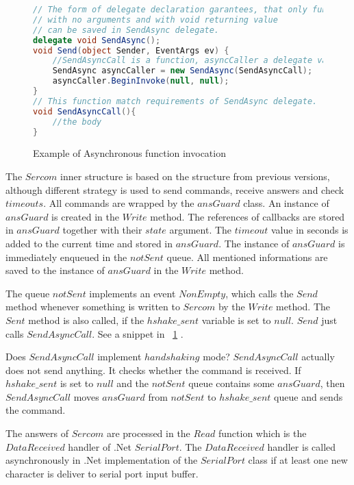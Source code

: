 \begin{figure}[!hbp]
\begin{lstlisting}[language=cs]
// The form of delegate declaration garantees, that only functions
// with no arguments and with void returning value 
// can be saved in SendAsync delegate.
delegate void SendAsync();
void Send(object Sender, EventArgs ev) {
	//SendAsyncCall is a function, asyncCaller a delegate variable
	SendAsync asyncCaller = new SendAsync(SendAsyncCall);
	asyncCaller.BeginInvoke(null, null);      
}
// This function match requirements of SendAsync delegate.
void SendAsyncCall(){
	//the body
}
\end{lstlisting}
\caption{Example of Asynchronous function invocation}\label{invocation}
\end{figure}


	The $Sercom$ inner structure is based on the structure from previous versions, although
	different strategy is used to send commands, receive answers and check $timeouts$.
	All commands are wrapped by the $ansGuard$ class. An instance of $ansGuard$ is created in the $Write$ method.
	The references of callbacks are stored in $ansGuard$ together with their $state$ argument.  
	The $timeout$ value in seconds is added to the current time and stored in $ansGuard$.
	The instance of $ansGuard$ is immediately enqueued in the $notSent$ queue.
	All mentioned informations are saved to the instance of $ansGuard$ in the $Write$ method.

	The queue $notSent$ implements an event $NonEmpty$, which calls the $Send$ method whenever something is written
	to $Sercom$ by the $Write$ method. The $Sent$ method is also called, if the $hshake\_sent$ variable is set to $null$.
	$Send$ just calls $SendAsyncCall$. See a snippet in ~\ref{invocation} .

	Does $SendAsyncCall$ implement $handshaking$ mode?
	$SendAsyncCall$ actually does not send anything. It checks whether the command is received. 
	If $hshake\_sent$ is set to $null$ and the $notSent$ queue
	contains some $ansGuard$, then $SendAsyncCall$ moves $ansGuard$ from $notSent$ to $hshake\_sent$
	queue and sends the command. 
	
	
	The answers of $Sercom$ are processed in the $Read$ function
	which is the $DataReceived$ handler of .Net $SerialPort$. The $DataReceived$ handler is called asynchronously
	in .Net implementation of the $SerialPort$ class if at least one new character is deliver to
	serial port input buffer. 

